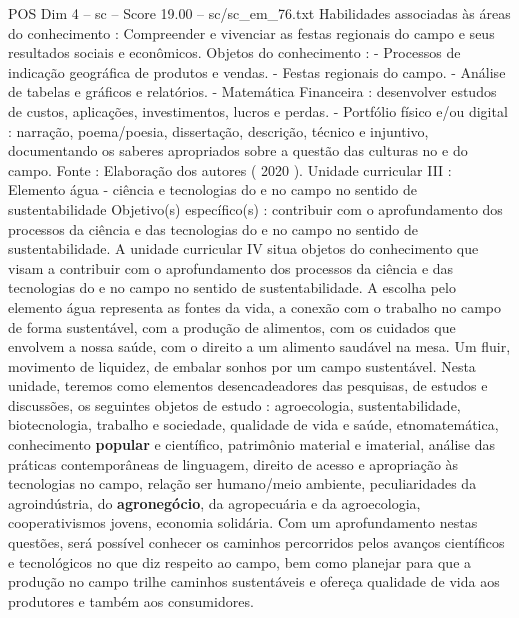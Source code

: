 \begin{textsample}{POS Dim 4 – sc – Score 19.00 – sc/sc\_em\_76.txt}
Habilidades associadas às áreas do conhecimento : Compreender e vivenciar as festas regionais do campo e seus resultados sociais e econômicos.
Objetos do conhecimento : - Processos de indicação geográfica de produtos e vendas. - Festas regionais do campo. - Análise de tabelas e gráficos e relatórios. - Matemática Financeira : desenvolver estudos de custos, aplicações, investimentos, lucros e perdas. - Portfólio físico e/ou digital : narração, poema/poesia, dissertação, descrição, técnico e injuntivo, documentando os saberes apropriados sobre a questão das culturas no e do campo.
Fonte : Elaboração dos autores ( 2020 ).
Unidade curricular III : Elemento água - ciência e tecnologias do e no campo no sentido de sustentabilidade Objetivo(s) específico(s) : contribuir com o aprofundamento dos processos da ciência e das tecnologias do e no campo no sentido de sustentabilidade.
A unidade curricular IV situa objetos do conhecimento que visam a contribuir com o aprofundamento dos processos da ciência e das tecnologias do e no campo no sentido de sustentabilidade.
A escolha pelo elemento água representa as fontes da vida, a conexão com o trabalho no campo de forma sustentável, com a produção de alimentos, com os cuidados que envolvem a nossa saúde, com o direito a um alimento saudável na mesa.
Um fluir, movimento de liquidez, de embalar sonhos por um campo sustentável.
Nesta unidade, teremos como elementos desencadeadores das pesquisas, de estudos e discussões, os seguintes objetos de estudo : agroecologia, sustentabilidade, biotecnologia, trabalho e sociedade, qualidade de vida e saúde, etnomatemática, conhecimento \textbf{popular} e científico, patrimônio material e imaterial, análise das práticas contemporâneas de linguagem, direito de acesso e apropriação às tecnologias no campo, relação ser humano/meio ambiente, peculiaridades da agroindústria, do \textbf{agronegócio}, da agropecuária e da agroecologia, cooperativismos jovens, economia solidária.
Com um aprofundamento nestas questões, será possível conhecer os caminhos percorridos pelos avanços científicos e tecnológicos no que diz respeito ao campo, bem como planejar para que a produção no campo trilhe caminhos sustentáveis e ofereça qualidade de vida aos produtores e também aos consumidores.

\end{textsample}
